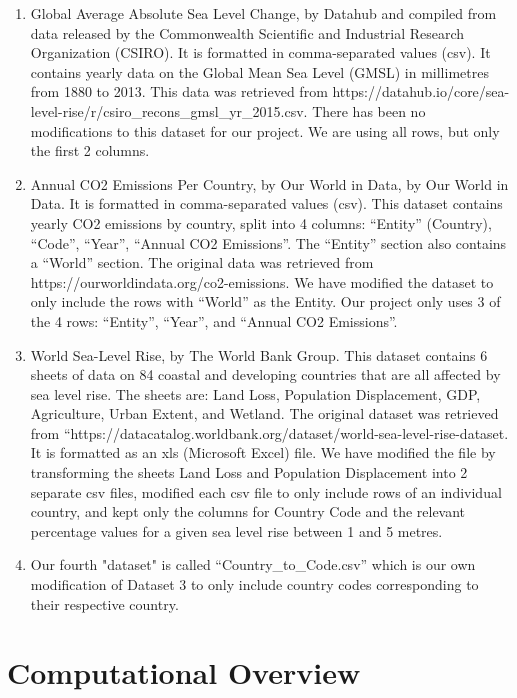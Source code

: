 \documentclass[fontsize=11pt]{article}
\begin{document}
\begin{enumerate}
    \item Global Average Absolute Sea Level Change, by Datahub and compiled from data released by the Commonwealth Scientific and Industrial Research Organization (CSIRO). It is formatted in comma-separated values (csv). It contains yearly data on the Global Mean Sea Level (GMSL) in millimetres from 1880 to 2013. This data was retrieved from https://datahub.io/core/sea-level-rise/r/csiro\_recons\_gmsl\_yr\_2015.csv. There has been no modifications to this dataset for our project. We are using all rows, but only the first 2 columns.
    \item Annual CO2 Emissions Per Country, by Our World in Data, by Our World in Data. It is formatted in comma-separated values (csv). This dataset contains yearly CO2 emissions by country, split into 4 columns: “Entity” (Country), “Code”, “Year”, “Annual CO2 Emissions”. The “Entity” section also contains a “World” section. The original data was retrieved from https://ourworldindata.org/co2-emissions. We have modified the dataset to only include the rows with “World” as the Entity. Our project only uses 3 of the 4 rows: “Entity”, “Year”, and “Annual CO2 Emissions”. 
    \item World Sea-Level Rise, by The World Bank Group. This dataset contains 6 sheets of data on 84 coastal and developing countries that are all affected by sea level rise. The sheets are: Land Loss, Population Displacement, GDP, Agriculture, Urban Extent, and Wetland. The original dataset was retrieved from “https://datacatalog.worldbank.org/dataset/world-sea-level-rise-dataset. It is formatted as an xls (Microsoft Excel) file. We have modified the file by transforming the sheets Land Loss and Population Displacement into 2 separate csv files, modified each csv file to only include rows of an individual country, and kept only the columns for Country Code and the relevant percentage values for a given sea level rise between 1 and 5 metres. 
    \item Our fourth "dataset" is called “Country\_to\_Code.csv” which is our own modification of Dataset 3 to only include country codes corresponding to their respective country.
    
\end{enumerate}


\newpage
\section*{Computational Overview}
\end{document}
